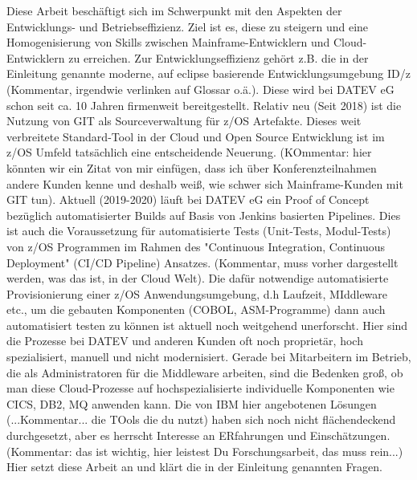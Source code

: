 Diese Arbeit beschäftigt sich im Schwerpunkt mit den Aspekten der Entwicklungs- und Betriebseffizienz. 
Ziel ist es, diese zu steigern und eine Homogenisierung von Skills zwischen Mainframe-Entwicklern und Cloud-Entwicklern zu erreichen. 
Zur Entwicklungseffizienz gehört z.B. die in der Einleitung genannte moderne, auf eclipse basierende Entwicklungsumgebung ID/z (Kommentar, irgendwie verlinken auf Glossar o.ä.).
Diese wird bei DATEV eG schon seit ca. 10 Jahren firmenweit bereitgestellt.
Relativ neu (Seit 2018) ist die Nutzung von GIT als Sourceverwaltung für z/OS Artefakte. Dieses weit verbreitete Standard-Tool in der Cloud und Open Source Entwicklung ist im z/OS Umfeld tatsächlich eine entscheidende Neuerung. (KOmmentar: hier könnten wir ein Zitat von mir einfügen, dass ich über Konferenzteilnahmen andere Kunden kenne und deshalb weiß, wie schwer sich Mainframe-Kunden mit GIT tun). 
Aktuell (2019-2020) läuft bei DATEV eG ein Proof of Concept bezüglich automatisierter Builds auf Basis von Jenkins basierten Pipelines.
Dies ist auch die Voraussetzung für automatisierte Tests (Unit-Tests, Modul-Tests) von z/OS Programmen im Rahmen des "Continuous Integration, Continuous Deployment" (CI/CD Pipeline) Ansatzes.  (Kommentar, muss vorher dargestellt werden, was das ist, in der Cloud Welt).
Die dafür notwendige automatisierte Provisionierung einer z/OS Anwendungsumgebung, d.h Laufzeit, MIddleware etc., um die gebauten Komponenten (COBOL, ASM-Programme) dann auch automatisiert testen zu können ist aktuell noch weitgehend unerforscht. Hier sind die Prozesse bei DATEV und anderen Kunden oft noch proprietär, hoch spezialisiert,  manuell und  nicht modernisiert. 
Gerade bei Mitarbeitern im Betrieb, die als Administratoren für die Middleware arbeiten, sind die Bedenken groß, ob man diese Cloud-Prozesse auf hochspezialisierte individuelle Komponenten wie CICS, DB2, MQ anwenden kann. Die von IBM hier angebotenen Lösungen (...Kommentar... die TOols die du nutzt) haben sich noch nicht flächendeckend durchgesetzt, aber es herrscht Interesse an ERfahrungen und Einschätzungen. (Kommentar: das ist wichtig, hier leistest Du Forschungsarbeit, das muss rein...)
Hier setzt diese Arbeit an und klärt die in der Einleitung genannten Fragen.


